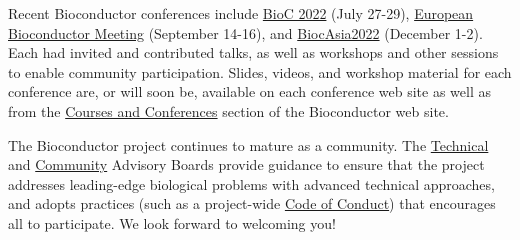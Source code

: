 Recent Bioconductor conferences include
\href{https://bioc2022.bioconductor.org}{BioC 2022} (July 27-29),
\href{https://eurobioc2022.bioconductor.org/}{European Bioconductor Meeting}
(September 14-16),
and \href{https://biocasia2022.bioconductor.org/}{BiocAsia2022} (December
1-2). Each had invited and contributed talks, as well as workshops and other sessions to enable community
participation. Slides, videos, and workshop material for each conference are, or
will soon be, available on each conference web site as well as from
the \href{http://bioconductor.org/help/course-materials/}{Courses and
Conferences} section of the Bioconductor web site.

The Bioconductor project continues to mature as a
community. The \href{https://bioconductor.org/about/technical-advisory-board/}{Technical}
and \href{https://bioconductor.org/about/community-advisory-board/}{Community}
Advisory Boards provide guidance to ensure that the project addresses
leading-edge biological problems with advanced technical approaches,
and adopts practices (such as a
project-wide \href{https://bioconductor.org/about/code-of-conduct/}{Code
of Conduct}) that encourages all to participate. We look forward to
welcoming you!

\address{Bioconductor Core Team \\
    Channing Division of Network Medicine \\
    Mass General Brigham \\
    Harvard Medical School, Boston, MA \\ \\
    Department of Data Science \\
    Dana-Farber Cancer Institute \\
    Harvard Medical School, Boston, MA \\ \\
    Biostatistics and Bioinformatics \\
    Roswell Park Comprehensive Cancer Center, Buffalo, NY \\ \\
    Fred Hutchinson Cancer Research Center, Seatlle, WA \\ \\
    CUNY Graduate School of Public Health, New York, NY}


